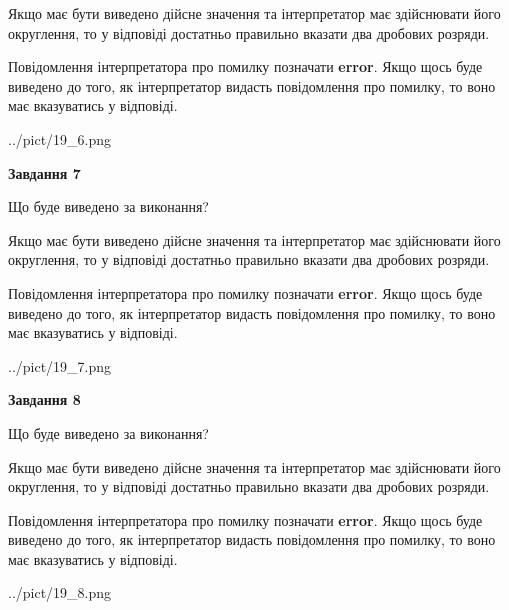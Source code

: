 \documentclass[12pt, ukrainian]{article}
\begin{document}
{\begin {Large}
Якщо має бути виведено дійсне значення та інтерпретатор має здійснювати його округлення, 
то у відповіді достатньо правильно вказати два дробових розряди.

Повідомлення інтерпретатора про помилку позначати \textbf{error}.
Якщо щось буде виведено до того, як інтерпретатор видасть повідомлення про помилку, 
то воно має вказуватись у відповіді. \par

\begin{center}
	{../pict/19_6.png}
\end{center}
\newpage

{\begin {center}\textbf{Завдання 7}\end {center}}\par
Що буде виведено за виконання? \par

Якщо має бути виведено дійсне значення та інтерпретатор має здійснювати його округлення, 
то у відповіді достатньо правильно вказати два дробових розряди.

Повідомлення інтерпретатора про помилку позначати \textbf{error}.
Якщо щось буде виведено до того, як інтерпретатор видасть повідомлення про помилку, 
то воно має вказуватись у відповіді. \par

\begin{center}
	{../pict/19_7.png}
\end{center}
\newpage

{\begin {center}\textbf{Завдання 8}\end {center}}\par
Що буде виведено за виконання? \par

Якщо має бути виведено дійсне значення та інтерпретатор має здійснювати його округлення, 
то у відповіді достатньо правильно вказати два дробових розряди.

Повідомлення інтерпретатора про помилку позначати \textbf{error}.
Якщо щось буде виведено до того, як інтерпретатор видасть повідомлення про помилку, 
то воно має вказуватись у відповіді. \par

\begin{center}
	{../pict/19_8.png}
\end{center}
\newpage


\end{Large}}
\end{document}

